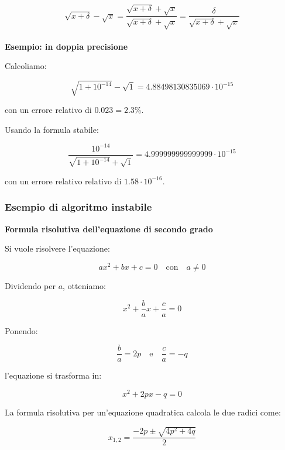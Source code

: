 \documentclass[a4paper, 11pt]{article}
\begin{document}
        \[
        \sqrt{x + \delta} - \sqrt{x} = \frac{\sqrt{x + \delta} + \sqrt{x}}{\sqrt{x + \delta} + \sqrt{x}} = \frac{\delta}{\sqrt{x + \delta} + \sqrt{x}}
        \]


        \paragraph{}
        \textbf{Esempio: in doppia precisione}

        Calcoliamo:


        \[
        \sqrt{1 + 10^{-14}} - \sqrt{1} = 4.88498130835069 \cdot 10^{-15}
        \]


        con un errore relativo di \(0.023 = 2.3\%\).

        Usando la formula stabile:


        \[
        \frac{10^{-14}}{\sqrt{1 + 10^{-14}} + \sqrt{1}} = 4.999999999999999 \cdot 10^{-15}
        \]


        con un errore relativo relativo di \(1.58 \cdot 10^{-16}\).

        \subsubsection*{Esempio di algoritmo instabile}

        \textbf{Formula risolutiva dell'equazione di secondo grado}

        Si vuole risolvere l'equazione:


        \[
            ax^2 + bx + c = 0 \quad \text{con} \quad a \neq 0
        \]



        Dividendo per \(a\), otteniamo:


        \[
            x^2 + \frac{b}{a}x + \frac{c}{a} = 0
        \]



        Ponendo:


        \[
        \frac{b}{a} = 2p \quad \text{e} \quad \frac{c}{a} = -q
        \]


        l'equazione si trasforma in:


        \[
        x^2 + 2px - q = 0
        \]



        La formula risolutiva per un'equazione quadratica calcola le due radici come:


        \[
        x_{1,2} = \frac{-2p \pm \sqrt{4p^2 + 4q}}{2}
        \]
\end{document}
